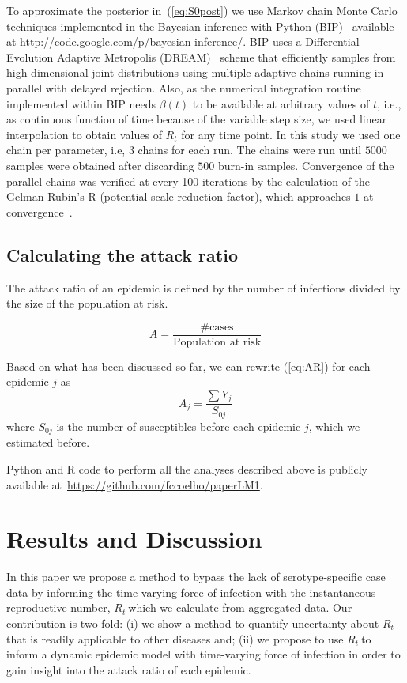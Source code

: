 \documentclass[10pt]{article}
\def \rr {$R_{t}\:$}
\begin{document}
To approximate the posterior in~(\ref{eq:S0post}) we use Markov chain Monte 
Carlo techniques implemented in the Bayesian inference with Python 
(BIP)~\cite{pone2011} available at  
\url{http://code.google.com/p/bayesian-inference/}.
BIP uses a Differential Evolution Adaptive Metropolis (DREAM)~\cite{vrugt2008} 
scheme that efficiently samples from high-dimensional joint distributions using 
multiple adaptive chains running in parallel with delayed rejection.
Also, as the numerical integration routine implemented within BIP needs 
$\beta(t)$ to be available at 
arbitrary values of $t$, i.e., as continuous function of time because of the 
variable step size, we used linear interpolation to obtain values of $R_t$ for 
any time point.
In this study we used one chain per parameter, i.e, 3 chains for each run.
The chains were run until $5000$ samples were obtained after discarding $500$ 
burn-in samples.
Convergence of the parallel chains was verified at every 100 iterations by the 
calculation of the Gelman-Rubin's R (potential scale 
reduction factor), which approaches $1$ at convergence~\cite{brooks1998}.

\subsection*{Calculating the attack ratio}

The attack ratio of an epidemic is defined by the number of infections divided 
by the size of the population at risk.

\begin{equation}
\label{eq:AR}
A=\frac{\text{\# cases}}{\text{Population at risk}} 
\end{equation}

Based on what has been discussed so far, we can rewrite (\ref{eq:AR}) for 
each epidemic $j$ as
\begin{equation}
\label{eq:AR2}
 A_{j}=\frac{\sum Y_j}{S_{0j}}
\end{equation}
where $S_{0j}$ is the number of susceptibles before each epidemic $j$, which we
estimated before.

Python and R code to perform all the analyses described above is publicly 
available at~\url{https://github.com/fccoelho/paperLM1}.

\section*{Results and Discussion}

In this paper we propose a method to bypass the lack of serotype-specific case 
data by informing the time-varying force of infection with the instantaneous 
reproductive number, \rr which we calculate from aggregated data.
Our contribution is two-fold: (i) we show a method to quantify uncertainty 
about \rr that is readily applicable to other diseases and; (ii) we propose to 
use \rr to inform a dynamic epidemic model with time-varying force of infection 
in order to gain insight into the attack ratio of each epidemic. 
\end{document}
